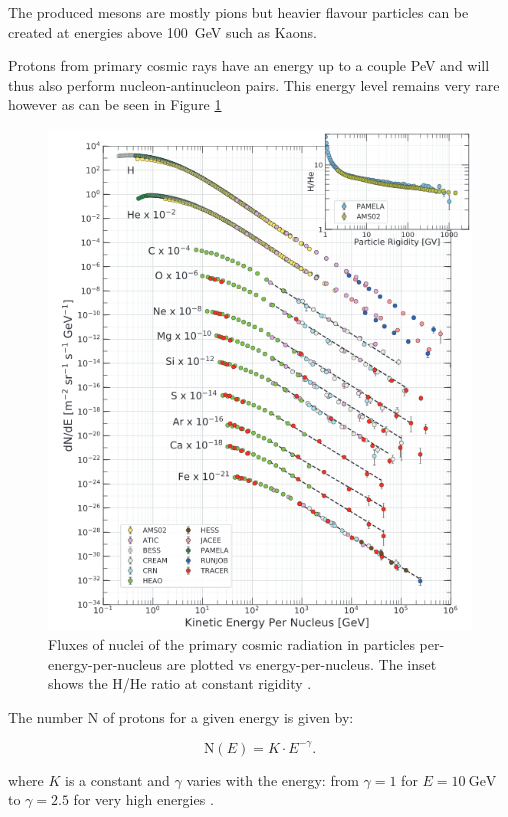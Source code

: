 The produced mesons are mostly pions but heavier flavour particles can be created at energies above \SI{100}{\giga\electronvolt} such as Kaons.

Protons from primary cosmic rays have an energy up to a couple PeV and will thus also perform nucleon-antinucleon pairs. This energy level remains very rare however as can be seen in Figure \ref{fig:knee}

\begin{figure}[htbp]
\centering
\includegraphics[width=\linewidth]{./fig/knee.png}
\caption{Fluxes of nuclei of the primary cosmic radiation in particles per-energy-per-nucleus are plotted vs energy-per-nucleus. The inset shows the H/He ratio at constant rigidity \cite{Tanabashi:2018oca}.}
\label{fig:knee}
\end{figure}

The number N of protons for a given energy is given by:

\begin{equation*}
\text{N}(E)=K\cdot E^{-\gamma}.
\end{equation*}

where $K$ is a constant and $\gamma$ varies with the energy: from $\gamma=1$ for $E=\SI{10}{\giga\electronvolt}$ to $\gamma=2.5$ for very high energies \cite{Tanabashi:2018oca}.

